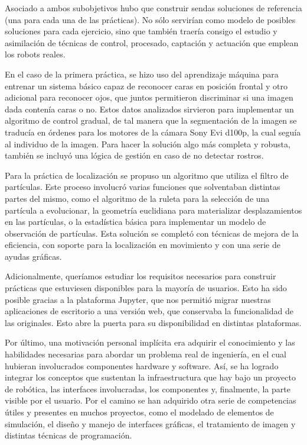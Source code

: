 Asociado a ambos subobjetivos hubo que construir sendas soluciones de referencia (una para cada una de las prácticas). No sólo servirían como modelo de posibles soluciones para cada ejercicio, sino que también traería consigo el estudio y asimilación de técnicas de control, procesado, captación y actuación que emplean los robots reales. 

En el caso de la primera práctica, se hizo uso del aprendizaje máquina para entrenar un sistema básico capaz de reconocer caras en posición frontal y otro adicional para reconocer ojos, que juntos permitieron discriminar si una imagen dada contenía caras o no. Estos datos analizados sirvieron para implementar un algoritmo de control gradual, de tal manera que la segmentación de la imagen se traducía en órdenes para los motores de la cámara Sony Evi d100p, la cual seguía al individuo de la imagen. Para hacer la solución algo más completa y robusta, también se incluyó una lógica de gestión en caso de no detectar rostros.

Para la práctica de localización se propuso un algoritmo que utiliza el filtro de partículas. Este proceso involucró varias funciones que solventaban distintas partes del mismo, como el algoritmo de la ruleta para la selección de una partícula a evolucionar, la geometría euclidiana para materializar desplazamientos en las partículas, o la estadística básica para implementar un modelo de observación de partículas. Esta solución se completó con técnicas de mejora de la eficiencia, con soporte para la localización en movimiento y con una serie de ayudas gráficas.

Adicionalmente, queríamos estudiar los requisitos necesarios para construir prácticas que estuviesen disponibles para la mayoría de usuarios. Esto ha sido posible gracias a la plataforma Jupyter, que nos permitió migrar nuestras aplicaciones de escritorio a una versión web, que conservaba la funcionalidad de las originales. Esto abre la puerta para su disponibilidad en distintas plataformas.

Por último, una motivación personal implícita era adquirir el conocimiento y las habilidades necesarias para abordar un problema real de ingeniería, en el cual hubieran involucrados componentes hardware y software. Así, se ha logrado integrar los conceptos que sustentan la infraestructura que hay bajo un proyecto de robótica, las interfaces involucradas, los componentes y, finalmente, la parte visible por el usuario. Por el camino se han adquirido otra serie de competencias útiles y presentes en muchos proyectos, como el modelado de elementos de simulación, el diseño y manejo de interfaces gráficas, el tratamiento de imagen y distintas técnicas de programación.

